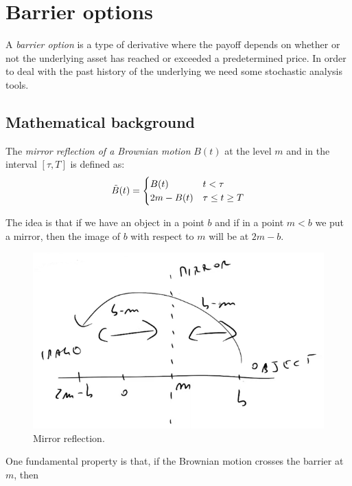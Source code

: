 \section{Barrier options} 
A \emph{barrier option} is a type of derivative where the payoff depends on whether or not the underlying asset has reached or exceeded a predetermined price. In order to deal with the past history of the underlying we need some stochastic analysis tools. 

\subsection{Mathematical background} 
\begin{definition}
The \emph{mirror reflection of a Brownian motion} $B(t)$ at the level $m$ and in the interval $[\tau,T]$ is defined as:
    \begin{equation}
        \Tilde{B}(t) = \begin{cases}
            B(t) & t<\tau \\
            2m - B(t) & \tau \le t\ge T
        \end{cases}
    \end{equation}
\end{definition}
The idea is that if we have an object in a point $b$ and if in a point $m<b$ we put a mirror, then the image of $b$ with respect to $m$ will be at $2m-b$.  
\begin{figure}[h]
    \centering
    \includegraphics[scale=0.3]{fig/tmp/fig33.png}
    \caption{Mirror reflection.}
    \label{fig:mirro}
\end{figure}
\newline One fundamental property is that, if the Brownian motion crosses the barrier at $m$, then
